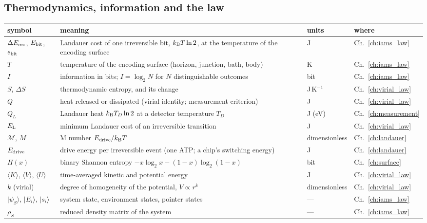 \subsection*{Thermodynamics, information and the law}
{\small\begin{longtable}{@{}>{\raggedright\arraybackslash}p{}>{\raggedright\arraybackslash}p{}>{\raggedright\arraybackslash}p{}>{\raggedright\arraybackslash}p{}@{}}
\toprule symbol & meaning & units & where\\\midrule\endhead
$\Delta E_{\rm rec}$, $E_{\rm bit}$, $e_{\rm bit}$ & Landauer cost of one irreversible bit, $k_{\mathrm B} T\ln2$, at the temperature of the encoding surface & J & Ch.~\ref{ch:iams_law}\\\iamrowrule
$T$ & temperature of the encoding surface (horizon, junction, bath, body) & K & Ch.~\ref{ch:iams_law}\\\iamrowrule
$I$ & information in bits; $I=\log_2N$ for $N$ distinguishable outcomes & bit & Ch.~\ref{ch:iams_law}\\\iamrowrule
$S$, $\Delta S$ & thermodynamic entropy, and its change & J\,K$^{-1}$ & Ch.~\ref{ch:virial_law}\\\iamrowrule
$Q$ & heat released or dissipated (virial identity; measurement criterion) & J & Ch.~\ref{ch:virial_law}\\\iamrowrule
$Q_L$ & Landauer heat $k_{\mathrm B} T_D\ln2$ at a detector temperature $T_D$ & J (eV) & Ch.~\ref{ch:measurement}\\\iamrowrule
$E_{\rm L}$ & minimum Landauer cost of an irreversible transition & J & Ch.~\ref{ch:virial_law}\\\iamrowrule
$\mathcal M$, $M$ & M number $E_{\rm drive}/k_{\mathrm B} T$ & dimensionless & Ch.~\ref{ch:landauer}\\\iamrowrule
$E_{\rm drive}$ & drive energy per irreversible event (one ATP; a chip's switching energy) & J & Ch.~\ref{ch:landauer}\\\iamrowrule
$H(x)$ & binary Shannon entropy $-x\log_2x-(1-x)\log_2(1-x)$ & bit & Ch.~\ref{ch:surface}\\\iamrowrule
$\langle K\rangle$, $\langle V\rangle$, $\langle U\rangle$ & time-averaged kinetic and potential energy & J & Ch.~\ref{ch:virial_law}\\\iamrowrule
$k$ (virial) & degree of homogeneity of the potential, $V\propto r^k$ & dimensionless & Ch.~\ref{ch:virial_law}\\\iamrowrule
$|\psi_S\rangle$, $|E_i\rangle$, $|s_i\rangle$ & system state, environment states, pointer states & --- & Ch.~\ref{ch:iams_law}\\\iamrowrule
$\rho_S$ & reduced density matrix of the system & --- & Ch.~\ref{ch:iams_law}\\
\bottomrule\end{longtable}}
